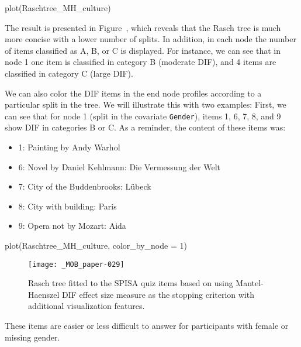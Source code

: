 \documentclass[doc,floatsintext,natbib]{apa7}
\begin{document}
\begin{Schunk}
\begin{Sinput}
 plot(Raschtree_MH_culture)
\end{Sinput}
\end{Schunk}

The result is presented in Figure~\label{fig:MHtree2}, which reveals that the Rasch tree is much more concise with a lower number of splits. In addition, in each node the number of items classified as A, B, or C is displayed. For instance, we can see that in node 1 one item is classified in category B (moderate DIF), and 4 items are classified in category C (large DIF).

We can also color the DIF items in the end node profiles according to a particular split in the tree. We will illustrate this with two examples: First, we can see that for node 1 (split in the covariate \texttt{Gender}), items 1, 6, 7, 8, and 9 show DIF in categories B or C. As a reminder, the content of these items was:

\begin{itemize}
\setlength\itemsep{0em}
\item 1: Painting by Andy Warhol
\item 6: Novel by Daniel Kehlmann: Die Vermessung der Welt
\item 7: City of the Buddenbrooks: Lübeck
\item 8: City with building: Paris
\item 9: Opera not by Mozart: Aida
\end{itemize}

\begin{Schunk}
\begin{Sinput}
 plot(Raschtree_MH_culture, color_by_node = 1)
\end{Sinput}
\end{Schunk}

\begin{figure}%
\caption{Rasch tree fitted to the SPISA quiz items based on using Mantel-Haenszel DIF effect size measure as the stopping criterion with additional visualization features.}
\texttt{[image: \_MOB\_paper-029]}
\label{fig:MHtree3}
\end{figure}%

These items are %
easier or less difficult to answer for participants with female or missing gender.

\end{document}
